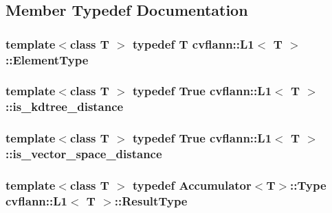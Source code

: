 \subsection{Member Typedef Documentation}
\hypertarget{structcvflann_1_1L1_a2e5f85d35af395e5654465e9a69643c0}{
\subsubsection[{Element\-Type}]{\setlength{\rightskip}{0pt plus 5cm}template$<$class T $>$ typedef {\bf T} {\bf cvflann\-::\-L1}$<$ {\bf T} $>$\-::{\bf Element\-Type}}}\label{structcvflann_1_1L1_a2e5f85d35af395e5654465e9a69643c0}
\hypertarget{structcvflann_1_1L1_aa3e6c602907baa81d90ddcfc33041874}{
\subsubsection[{is\-\_\-kdtree\-\_\-distance}]{\setlength{\rightskip}{0pt plus 5cm}template$<$class T $>$ typedef {\bf True} {\bf cvflann\-::\-L1}$<$ {\bf T} $>$\-::{\bf is\-\_\-kdtree\-\_\-distance}}}\label{structcvflann_1_1L1_aa3e6c602907baa81d90ddcfc33041874}
\hypertarget{structcvflann_1_1L1_a1df70c0d506c0446a8e55d60c697a55c}{
\subsubsection[{is\-\_\-vector\-\_\-space\-\_\-distance}]{\setlength{\rightskip}{0pt plus 5cm}template$<$class T $>$ typedef {\bf True} {\bf cvflann\-::\-L1}$<$ {\bf T} $>$\-::{\bf is\-\_\-vector\-\_\-space\-\_\-distance}}}\label{structcvflann_1_1L1_a1df70c0d506c0446a8e55d60c697a55c}
\hypertarget{structcvflann_1_1L1_a4b809418ce6bf89439d5dbd0ccd42220}{
\subsubsection[{Result\-Type}]{\setlength{\rightskip}{0pt plus 5cm}template$<$class T $>$ typedef {\bf Accumulator}$<${\bf T}$>$\-::Type {\bf cvflann\-::\-L1}$<$ {\bf T} $>$\-::{\bf Result\-Type}}}\label{structcvflann_1_1L1_a4b809418ce6bf89439d5dbd0ccd42220}


